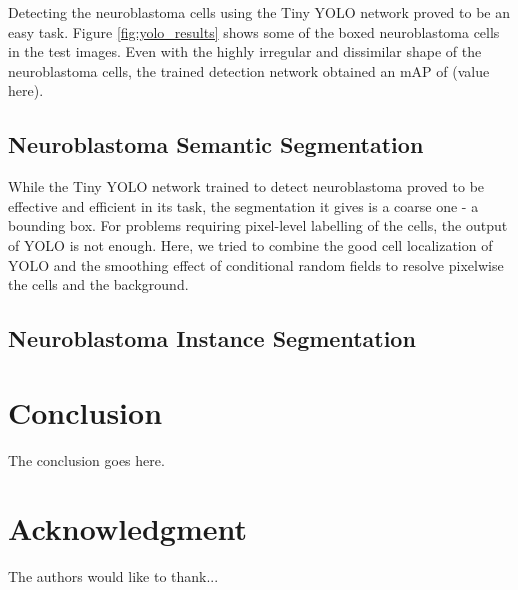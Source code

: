 \documentclass[journal]{IEEEtran}
\begin{document}
Detecting the neuroblastoma cells using the Tiny YOLO network proved to be an easy task. Figure \ref{fig:yolo_results} shows some of the boxed neuroblastoma cells in the test images.
Even with the highly irregular and dissimilar shape of the neuroblastoma cells, the trained detection network obtained an mAP of (value here).
\subsection{Neuroblastoma Semantic Segmentation}
While the Tiny YOLO network trained to detect neuroblastoma proved to be effective and efficient in its task, the segmentation it gives is a coarse one - a bounding box. For problems requiring pixel-level labelling of the cells, the output of YOLO is not enough. Here, we tried to combine the good cell localization of YOLO and the smoothing effect of conditional random fields to resolve pixelwise the cells and the background.


\subsection{Neuroblastoma Instance Segmentation}


\section{Conclusion}
The conclusion goes here.


\section*{Acknowledgment}


The authors would like to thank...


\ifCLASSOPTIONcaptionsoff
  \newpage
\fi





%


%




\end{document}
